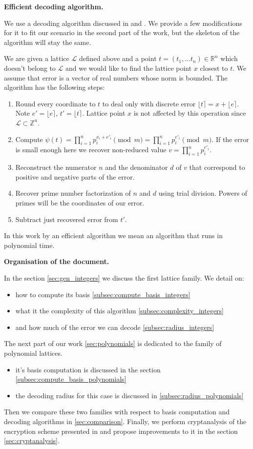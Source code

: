 \documentclass[12pt]{article}
\newcommand{\ZZ}{\mathbb{Z}}
\newcommand{\LL}{\mathcal{L}}
\begin{document}
\textbf{Efficient decoding algorithm.}

We use a decoding algorithm discussed in \cite{[DP19]} and \cite{[LLXY17]}. We provide a few modifications for it to fit our scenario in the second part of the work, but the skeleton of the algorithm will stay the same.

We are given a lattice $\LL$ defined above and a point $t = (t_1, \dots t_n) \in \mathbb{R}^{n}$ which doesn't belong to $\LL$ and we would like to find the lattice point $x$ closest to $t$. We assume that error is a vector of real numbers whose norm is bounded. The algorithm has the following steps:

\begin{enumerate}
    \item Round every coordinate to $t$ to deal only with discrete error $\lfloor t \rceil = x + \lfloor e \rceil$. Note $e' = \lfloor e \rceil$, $t' = \lfloor t \rceil$. Lattice point $x$ is not affected by this operation since $\LL \subset \ZZ^{n}$.
    \item Compute $\psi(t) = \prod_{i=1}^{n}p_{i}^{x_{i} + e'_i} \pmod{m} = \prod_{i=1}^{n}p_{i}^{e'_i} \pmod{m}$. If the error is small enough here we recover non-reduced value $v = \prod_{i=1}^{n}p_{i}^{e'_i}$.
    \item Reconstruct the numerator $n$ and the denominator $d$ of $v$ that correspond to positive and negative parts of the error.
    \item Recover prime number factorization of $n$ and $d$ using trial division. Powers of primes will be the coordinates of our error.
    \item Subtract just recovered error from $t'$.
\end{enumerate}
In this work by an efficient algorithm we mean an algorithm that runs in polynomial time.

\textbf{Organisation of the document.}

In the section \ref{sec:gen_integers} we discuss the first lattice family. We detail on:
\begin{itemize}
    \item how to compute its basis \ref{subsec:compute_basis_integers}
    \item what it the complexity of this algorithm \ref{subsec:complexity_integers}
    \item and how much of the error we can decode \ref{subsec:radius_integers}
\end{itemize}
The next part of our work \ref{sec:polynomials} is dedicated to the family of polynomial lattices.
\begin{itemize}
    \item it's basis computation is discussed in the section \ref{subsec:compute_basis_polynomials}
    \item the decoding radius for this case is discussed in \ref{subsec:radius_polynomials}
\end{itemize}
Then we compare these two families with respect to basis computation and decoding algorithms in \ref{sec:comparison}. Finally, we perform cryptanalysis of the encryption scheme presented in \cite{[LLXY17]} and propose improvements to it in the section \ref{sec:cryptanalysis}.
\end{document}
